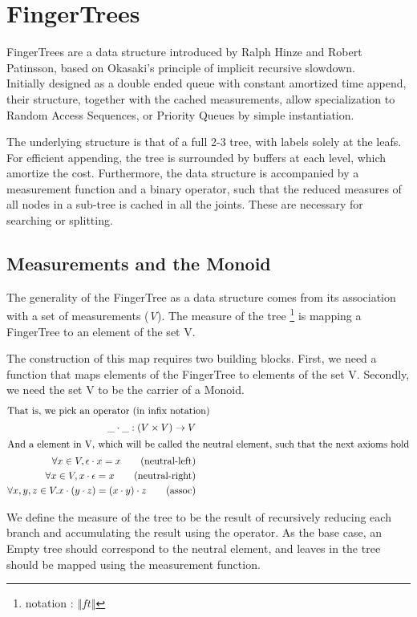 \documentclass[12pt,twoside,notitlepage]{report}
\begin{document}
\section{FingerTrees} 

	FingerTrees are a data structure introduced by Ralph Hinze and Robert Patinsson, based on Okasaki's principle of implicit recursive slowdown. \\ 
Initially designed as a double ended queue with constant amortized time append, their structure, together with the cached measurements, allow specialization to Random Access Sequences, or Priority Queues by simple instantiation.  
 
 	The underlying structure is that of a full 2-3 tree, with labels solely at the leafs. For efficient appending, the tree is surrounded by buffers at each level, which amortize the cost. Furthermore, the data structure is accompanied by a measurement function and a binary operator, such that the reduced measures of all nodes in a sub-tree is cached in all the joints. These are necessary for searching or splitting.

\subsection{Measurements and the Monoid}
\label{sec:measure}
The generality of the FingerTree as a data structure comes from its association with a set of measurements (\textit{V}). The measure of the tree \footnote{notation : $\Vert ft \Vert$} is mapping a FingerTree to an element of the set V.

The construction of this map requires two building blocks. First, we need a function that maps elements of the FingerTree to elements of the set V. Secondly, we need the set V to be the carrier of a Monoid.
\begin{align*}
\intertext{That is, we pick an operator (in infix notation)} 
	\_\cdot\_ : (V \times V) \to V \\ 
\intertext{And a element in V, which will be called the neutral element, such that the next axioms hold} 
	\forall	x \in V, \epsilon \cdot x = x  \tag{neutral-left}\\
	\forall x \in V, x \cdot \epsilon = x  \tag{neutral-right} \\
	\forall x, y,z \in V. x \cdot (y \cdot z) = (x \cdot y) \cdot z \tag{assoc} 
\end{align*}

We define the measure of the tree to be the result of recursively reducing each branch and accumulating the result using the operator. As the base case, an Empty tree should correspond to the neutral element, and leaves in the tree should be mapped using the measurement function.
\end{document}

